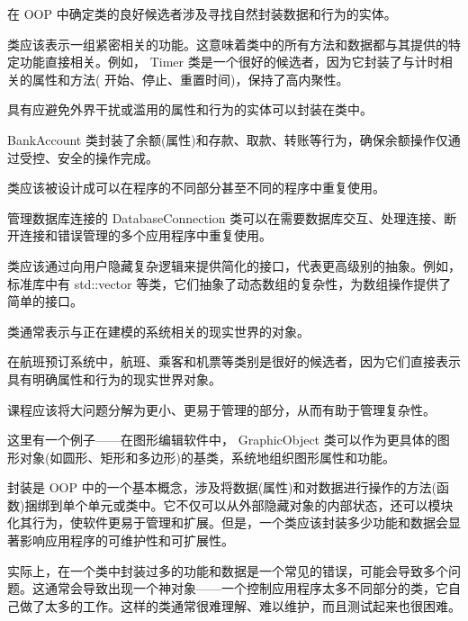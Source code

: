 
在 OOP 中确定类的良好候选者涉及寻找自然封装数据和行为的实体。


类应该表示一组紧密相关的功能。这意味着类中的所有方法和数据都与其提供的特定功能直接相关。例如， Timer 类是一个很好的候选者，因为它封装了与计时相关的属性和方法( 开始、停止、重置时间)，保持了高内聚性。


具有应避免外界干扰或滥用的属性和行为的实体可以封装在类中。

BankAccount 类封装了余额(属性)和存款、取款、转账等行为，确保余额操作仅通过受控、安全的操作完成。


类应该被设计成可以在程序的不同部分甚至不同的程序中重复使用。

管理数据库连接的 DatabaseConnection 类可以在需要数据库交互、处理连接、断开连接和错误管理的多个应用程序中重复使用。


类应该通过向用户隐藏复杂逻辑来提供简化的接口，代表更高级别的抽象。例如，标准库中有 std::vector 等类，它们抽象了动态数组的复杂性，为数组操作提供了简单的接口。


类通常表示与正在建模的系统相关的现实世界的对象。

在航班预订系统中，航班、乘客和机票等类别是很好的候选者，因为它们直接表示具有明确属性和行为的现实世界对象。


课程应该将大问题分解为更小、更易于管理的部分，从而有助于管理复杂性。

这里有一个例子——在图形编辑软件中， GraphicObject 类可以作为更具体的图形对象(如圆形、矩形和多边形)的基类，系统地组织图形属性和功能。


封装是 OOP 中的一个基本概念，涉及将数据(属性)和对数据进行操作的方法(函数)捆绑到单个单元或类中。它不仅可以从外部隐藏对象的内部状态，还可以模块化其行为，使软件更易于管理和扩展。但是，一个类应该封装多少功能和数据会显著影响应用程序的可维护性和可扩展性。


实际上，在一个类中封装过多的功能和数据是一个常见的错误，可能会导致多个问题。这通常会导致出现一个神对象——一个控制应用程序太多不同部分的类，它自己做了太多的工作。这样的类通常很难理解、难以维护，而且测试起来也很困难。

